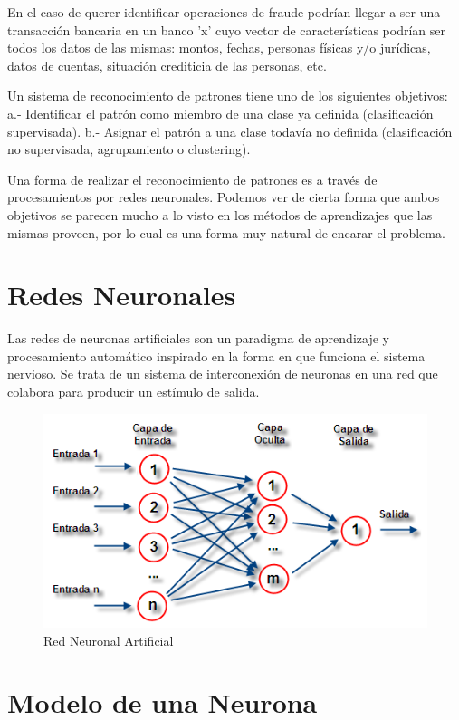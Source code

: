 \documentclass[a4paper,11pt]{article}
\begin{document}
      En el caso de querer identificar operaciones de fraude podrían  llegar
a  ser  una  transacción  bancaria  en  un  banco   'x'   cuyo   vector   de
características podrían ser todos los datos de las mismas:  montos,  fechas,
personas físicas y/o jurídicas, datos de cuentas,  situación  crediticia  de
las personas, etc.

      Un sistema de reconocimiento de patrones tiene uno de  los  siguientes
objetivos:
      a.- Identificar el patrón  como  miembro  de  una  clase  ya  definida
(clasificación supervisada).
      b.- Asignar el patrón a una clase todavía no  definida  (clasificación
no supervisada,  agrupamiento o clustering).

      Una forma de realizar el reconocimiento de patrones  es  a  través  de
procesamientos por redes neuronales. Podemos ver de cierta forma  que  ambos
objetivos se parecen mucho a lo visto en los  métodos  de  aprendizajes  que
las mismas proveen, por lo cual es una  forma  muy  natural  de  encarar  el
problema.


\section{Redes Neuronales}

Las redes de  neuronas  artificiales  son  un  paradigma  de  aprendizaje  y
procesamiento automático inspirado en la forma en que  funciona  el  sistema
nervioso. Se trata de un sistema de interconexión de  neuronas  en  una  red
que colabora para producir un estímulo de salida.


\begin{figure}[h!]
  \centering
\includegraphics{docs/RedNeuronalArtificial.png}
  \caption{Red Neuronal Artificial}
\end{figure}


\section{Modelo de una Neurona}
\end{document}
